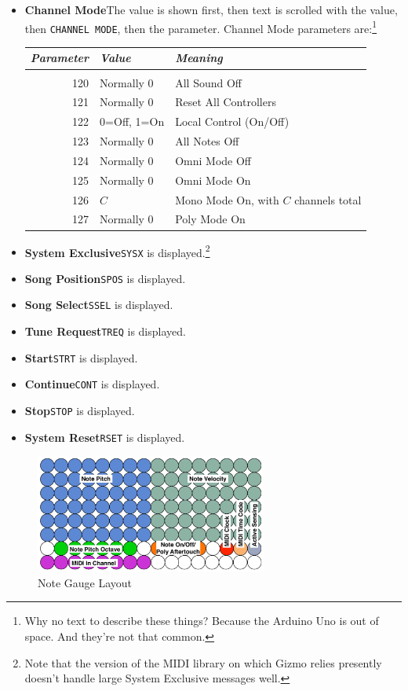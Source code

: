 \documentclass{article}
\begin{document}
\begin{itemize}
\item {\bf Channel Mode}\quad The value is shown first, then text is scrolled with the value, then \texttt{CHANNEL MODE}, then the parameter.  Channel Mode parameters are:\footnote{Why no text to describe these things?  Because the Arduino Uno is out of space.  And they're not that common.}
\begin{center}\begin{tabular}{@{}rll@{}}
{\it Parameter}&{\it Value}&{\it Meaning}\\[0.1em]
\hline\\[-0.9em]
120&Normally 0&All Sound Off\\
121&Normally 0&Reset All Controllers\\
122&0=Off, 1=On&Local Control (On/Off)\\
123&Normally 0&All Notes Off\\
124&Normally 0&Omni Mode Off\\
125&Normally 0&Omni Mode On\\
126&\(C\)&Mono Mode On, with \(C\) channels total\\
127&Normally 0&Poly Mode On\\
\end{tabular}\end{center}
\item {\bf System Exclusive}\quad \texttt{SYSX} is displayed.\footnote{Note that the version of the MIDI library on which Gizmo relies presently doesn't handle large System Exclusive messages well.}
\item {\bf Song Position}\quad \texttt{SPOS} is displayed.
\item {\bf Song Select}\quad \texttt{SSEL} is displayed.
\item {\bf Tune Request}\quad \texttt{TREQ} is displayed.
\item {\bf Start}\quad \texttt{STRT} is displayed.
\item {\bf Continue}\quad \texttt{CONT} is displayed.
\item {\bf Stop}\quad \texttt{STOP} is displayed.
\item {\bf System Reset}\quad \texttt{RSET} is displayed.
\end{itemize}



\begin{figure}
\vspace{-5em}\includegraphics[width=3in]{NoteGauge.pdf}
\vspace{-2em}\caption{\small Note Gauge Layout}\vspace{-1em}
\label{notegauge}
\end{figure}
\end{document}
